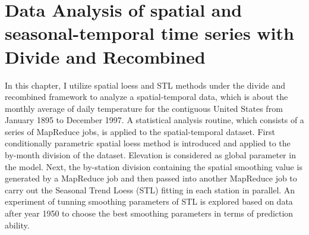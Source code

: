 \chapter{Data Analysis of spatial and seasonal-temporal time series with 
Divide and Recombined}

In this chapter, I utilize spatial loess and STL methods under the divide 
and recombined framework to analyze a spatial-temporal data, which is about the 
monthly average of daily temperature for the contiguous United States from 
January 1895 to December 1997. A statistical analysis routine, which consists of 
a series of MapReduce jobs, is applied to the spatial-temporal dataset. First 
conditionally parametric spatial loess method is introduced and applied to the 
by-month division of the dataset. Elevation is considered as global parameter in 
the model. Next, the by-station division containing the spatial smoothing value
is generated by a MapReduce job and then passed into another MapReduce job to 
carry out the Seasonal Trend Loess (STL) fitting in each station in parallel. 
An experiment of tunning smoothing parameters of STL is explored based on 
data after year 1950 to choose the best smoothing parameters in terms of 
prediction ability.














